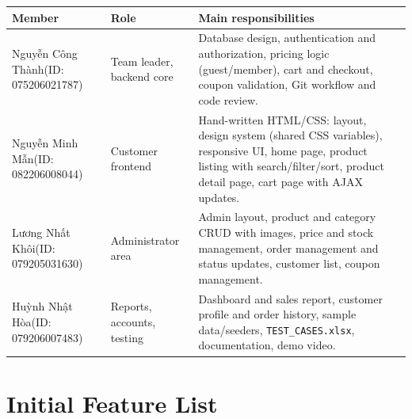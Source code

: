 \documentclass[12pt,a4paper]{article}
\newcommand{\MemberA}{Nguyễn Công Thành\newline (ID: 075206021787)}
\newcommand{\MemberB}{Nguyễn Minh Mẫn\newline (ID: 082206008044)}
\newcommand{\MemberC}{Lương Nhất Khôi\newline (ID: 079205031630)}
\newcommand{\MemberD}{Huỳnh Nhật Hòa\newline (ID: 079206007483)}
\begin{document}
\begin{tabularx}{\linewidth}{|L{3.3cm}|L{2.7cm}|Y|}
\hline
{} \textbf{Member} & \textbf{Role} & \textbf{Main responsibilities} \\ \hline \endhead
\MemberA & Team leader, backend core & Database design, authentication and authorization, pricing logic
          (guest/member), cart and checkout, coupon validation, Git workflow and code review. \\ \hline
\MemberB & Customer frontend & Hand-written HTML/CSS: layout, design system (shared CSS variables),
          responsive UI, home page, product listing with search/filter/sort, product detail page,
          cart page with AJAX updates. \\ \hline
\MemberC & Administrator area & Admin layout, product and category CRUD with images, price and stock
          management, order management and status updates, customer list, coupon management. \\ \hline
\MemberD & Reports, accounts, testing & Dashboard and sales report, customer profile and order history,
          sample data/seeders, \texttt{TEST\_CASES.xlsx}, documentation, demo video. \\ \hline
\end{tabularx}

\section{Initial Feature List}
\end{document}
